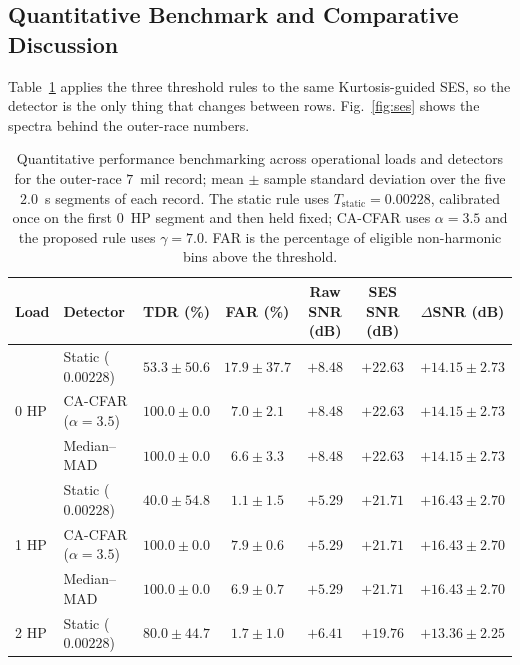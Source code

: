 \subsection{Quantitative Benchmark and Comparative Discussion}
Table~\ref{tab:benchmark} applies the three threshold rules to the same
Kurtosis-guided SES, so the detector is the only thing that changes between
rows. Fig.~\ref{fig:ses} shows the spectra behind the outer-race numbers.

\begin{table}[!t]
\centering
\caption{Quantitative performance benchmarking across operational loads and
detectors for the outer-race $7$~mil record; mean $\pm$ sample standard
deviation over the five $2.0$~s segments of each record. The static rule uses
$T_{\text{static}}=0.00228$, calibrated once on the first $0$~HP segment and
then held fixed; CA-CFAR uses $\alpha=3.5$ and the proposed rule uses
$\gamma=7.0$. FAR is the percentage of eligible non-harmonic bins above the
threshold.}
\label{tab:benchmark}
\footnotesize
\setlength{\tabcolsep}{5pt}
\begin{tabular}{llccccc}
\toprule
Load & Detector & TDR (\%) & FAR (\%) & Raw SNR (dB) & SES SNR (dB) &
$\Delta$SNR (dB) \\
\midrule
\multirow{3}{*}{0 HP}
 & Static ($0.00228$)   & $53.3 \pm 50.6$ & $17.9 \pm 37.7$ & $+8.48$ & $+22.63$ & $+14.15 \pm 2.73$ \\
 & CA-CFAR ($\alpha=3.5$) & $100.0 \pm 0.0$ & $7.0 \pm 2.1$ & $+8.48$ & $+22.63$ & $+14.15 \pm 2.73$ \\
 & Median--MAD           & $100.0 \pm 0.0$ & $6.6 \pm 3.3$ & $+8.48$ & $+22.63$ & $+14.15 \pm 2.73$ \\
\midrule
\multirow{3}{*}{1 HP}
 & Static ($0.00228$)   & $40.0 \pm 54.8$ & $1.1 \pm 1.5$ & $+5.29$ & $+21.71$ & $+16.43 \pm 2.70$ \\
 & CA-CFAR ($\alpha=3.5$) & $100.0 \pm 0.0$ & $7.9 \pm 0.6$ & $+5.29$ & $+21.71$ & $+16.43 \pm 2.70$ \\
 & Median--MAD           & $100.0 \pm 0.0$ & $6.9 \pm 0.7$ & $+5.29$ & $+21.71$ & $+16.43 \pm 2.70$ \\
\midrule
\multirow{3}{*}{2 HP}
 & Static ($0.00228$)   & $80.0 \pm 44.7$ & $1.7 \pm 1.0$ & $+6.41$ & $+19.76$ & $+13.36 \pm 2.25$ \\

\end{tabular}
\end{table}
